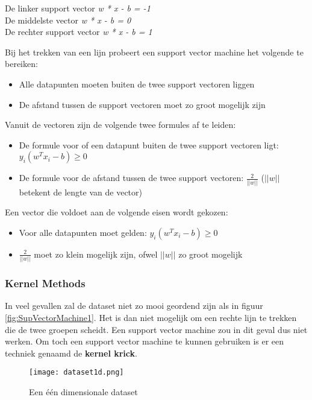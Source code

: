 \begin{center}
De linker support vector	\textit{w * x - b = -1}
\\De middelste vector			\textit{w * x - b = 0}
\\De rechter support vector 	\textit{w * x - b = 1}
\end{center}

Bij het trekken van een lijn probeert een support vector machine het volgende te bereiken:

\begin{itemize}
\item Alle datapunten moeten buiten de twee support vectoren liggen
\item De afstand tussen de support vectoren moet zo groot mogelijk zijn
\end{itemize}


Vanuit de vectoren zijn de volgende twee formules af te leiden:
\begin{itemize}
\item De formule voor of een datapunt buiten de twee support vectoren ligt: $y_{i}(w^{T}x_{i} - b) \geq 0 $
\item De formule voor de afstand tussen de twee support vectoren: $\frac{2}{||w||}$ ($||w||$ betekent de lengte van de vector)
\end{itemize} 


Een vector die voldoet aan de volgende eisen wordt gekozen:
\begin{itemize}
\item Voor alle datapunten moet gelden: $y_{i}(w^{T}x_{i} - b) \geq 0 $
\item $\frac{2}{||w||}$ moet zo klein mogelijk zijn, ofwel $||w||$ zo groot mogelijk
\end{itemize}



\subsubsection{Kernel Methods}
In veel gevallen zal de dataset niet zo mooi geordend zijn als in figuur \ref{fig:SupVectorMachine1}. Het is dan niet mogelijk om een rechte lijn te trekken die de twee groepen scheidt. Een support vector machine zou in dit geval dus niet werken. Om toch een support vector machine te kunnen gebruiken is er een techniek genaamd de \textbf{kernel krick}.

\begin{figure}[H]
  \centering
    \texttt{[image: dataset1d.png]}
  \caption{Een \'{e}\'{e}n dimensionale dataset}
  \label{fig:SupVectorMachineKernel}
\end{figure}

